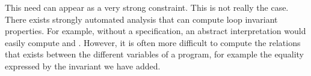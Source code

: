 \begin{Information}
  This need can appear as a very strong constraint. This is not really the
  case. There exists strongly automated analysis that can compute loop
  invariant properties. For example, without a specification, an abstract
  interpretation would easily compute 
  and .
  However, it is often more difficult to compute the relations
  that exists between the different variables of a program, for
  example the equality expressed by the invariant we have
  added.
\end{Information}
